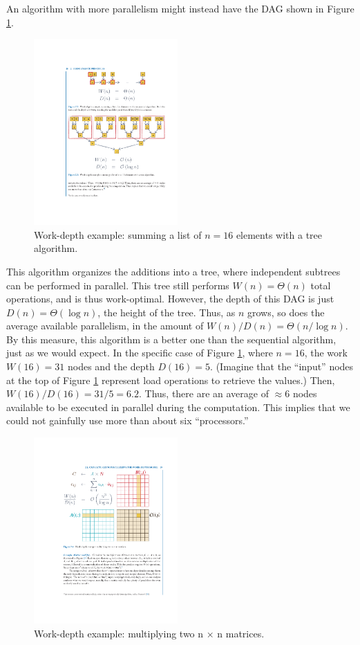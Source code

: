 \documentclass[twocolumn]{article}
\begin{document}
An algorithm with more parallelism might instead have the DAG shown in Figure \ref{fig:worker-depth-16}. 
\begin{figure}[htb]
        \centering
        \includegraphics[width=0.49\textwidth]{work-depth-16.pdf}
        \caption{Work-depth example: summing a list of $n = 16$ elements with a tree algorithm.}
        \label{fig:worker-depth-16}
\end{figure}
This algorithm organizes the additions into a tree, where independent subtrees can be performed in parallel. 
This tree still performs $W (n) =\Theta(n)$ total operations, and is thus work-optimal. 
However, the depth of this DAG is just $D(n) =\Theta(\log n)$, the height of the tree. 
Thus, as $n$ grows, so does the average available parallelism, in the amount of $W (n)/D(n) =\Theta(n/ \log n)$. 
By this measure, this algorithm is a better one than the sequential algorithm, just as we would expect.
In the specific case of Figure \ref{fig:worker-depth-16}, where $n = 16$, the work $W (16) = 31$ nodes and the depth $D(16) = 5$. (Imagine that the “input” nodes at the top of Figure \ref{fig:worker-depth-16} represent load operations to retrieve the values.) Then, $W (16)/D(16) = 31/5 = 6.2$. Thus, there are an average of  $\approx 6$ nodes available to be executed in parallel during the computation. This implies that we could not gainfully use more than about six “processors.”
\begin{figure}[htb]
        \centering
        \includegraphics[width=0.49\textwidth]{matrix-work-depth.pdf}
        \caption{Work-depth example: multiplying two n × n matrices.}
        \label{fig:matrix}
\end{figure}
\end{document}
